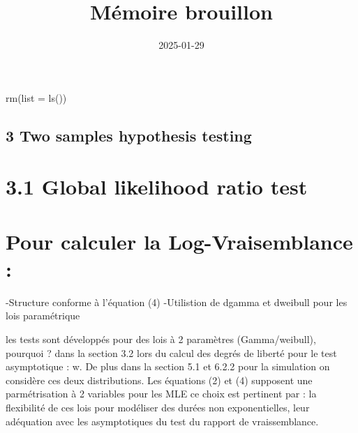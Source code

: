 \documentclass[
]{article}
\title{Mémoire brouillon}
\author{}
\date{\vspace{-2.5em}2025-01-29}
\begin{document}
\maketitle

rm(list = ls())

\subsection{3 Two samples hypothesis
testing}\label{two-samples-hypothesis-testing}

\section{3.1 Global likelihood ratio
test}\label{global-likelihood-ratio-test}

\section{Pour calculer la Log-Vraisemblance
:}\label{pour-calculer-la-log-vraisemblance}

-Structure conforme à l'équation (4) -Utilistion de dgamma et dweibull
pour les lois paramétrique

les tests sont développés pour des lois à 2 paramètres (Gamma/weibull),
pourquoi ? dans la section 3.2 lors du calcul des degrés de liberté pour
le test asymptotique : \textbar w. De plus dans la section 5.1
et 6.2.2 pour la simulation on considère ces deux distributions. Les
équations (2) et (4) supposent une parmétrisation à 2 variables pour les
MLE ce choix est pertinent par : la flexibilité de ces lois pour
modéliser des durées non exponentielles, leur adéquation avec les
asymptotiques du test du rapport de vraissemblance.
\end{document}
